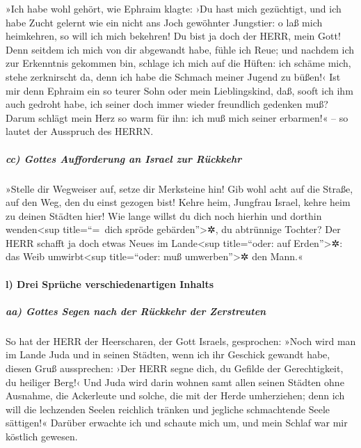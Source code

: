 »Ich habe wohl gehört, wie Ephraim klagte: ›Du hast mich
gezüchtigt, und ich habe Zucht gelernt wie ein nicht ans Joch gewöhnter
Jungstier: o laß mich heimkehren, so will ich mich bekehren! Du bist ja
doch der HERR, mein Gott! Denn seitdem ich mich von dir
abgewandt habe, fühle ich Reue; und nachdem ich zur Erkenntnis gekommen
bin, schlage ich mich auf die Hüften: ich schäme mich, stehe zerknirscht
da, denn ich habe die Schmach meiner Jugend zu büßen!‹
Ist mir denn Ephraim ein so teurer Sohn oder mein
Lieblingskind, daß, sooft ich ihm auch gedroht habe, ich seiner doch
immer wieder freundlich gedenken muß? Darum schlägt mein Herz so warm
für ihn: ich muß mich seiner erbarmen!« -- so lautet der Ausspruch des
HERRN.

\hypertarget{cc-gottes-aufforderung-an-israel-zur-ruxfcckkehr}{%
\subparagraph{cc) Gottes Aufforderung an Israel zur
Rückkehr}\label{cc-gottes-aufforderung-an-israel-zur-ruxfcckkehr}}

»Stelle dir Wegweiser auf, setze dir Merksteine hin! Gib
wohl acht auf die Straße, auf den Weg, den du einst gezogen bist! Kehre
heim, Jungfrau Israel, kehre heim zu deinen Städten hier!
Wie lange willst du dich noch hierhin und dorthin
wenden\textless sup title=``=~dich spröde gebärden''\textgreater✲, du
abtrünnige Tochter? Der HERR schafft ja doch etwas Neues im
Lande\textless sup title=``oder: auf Erden''\textgreater✲: das Weib
umwirbt\textless sup title=``oder: muß umwerben''\textgreater✲ den
Mann.«

\hypertarget{l-drei-spruxfcche-verschiedenartigen-inhalts}{%
\paragraph{l) Drei Sprüche verschiedenartigen
Inhalts}\label{l-drei-spruxfcche-verschiedenartigen-inhalts}}

\hypertarget{aa-gottes-segen-nach-der-ruxfcckkehr-der-zerstreuten}{%
\subparagraph{aa) Gottes Segen nach der Rückkehr der
Zerstreuten}\label{aa-gottes-segen-nach-der-ruxfcckkehr-der-zerstreuten}}

So hat der HERR der Heerscharen, der Gott Israels,
gesprochen: »Noch wird man im Lande Juda und in seinen Städten, wenn ich
ihr Geschick gewandt habe, diesen Gruß aussprechen: ›Der HERR segne
dich, du Gefilde der Gerechtigkeit, du heiliger Berg!‹
Und Juda wird darin wohnen samt allen seinen Städten ohne
Ausnahme, die Ackerleute und solche, die mit der Herde umherziehen;
denn ich will die lechzenden Seelen reichlich tränken und
jegliche schmachtende Seele sättigen!« Darüber erwachte
ich und schaute mich um, und mein Schlaf war mir köstlich gewesen.

